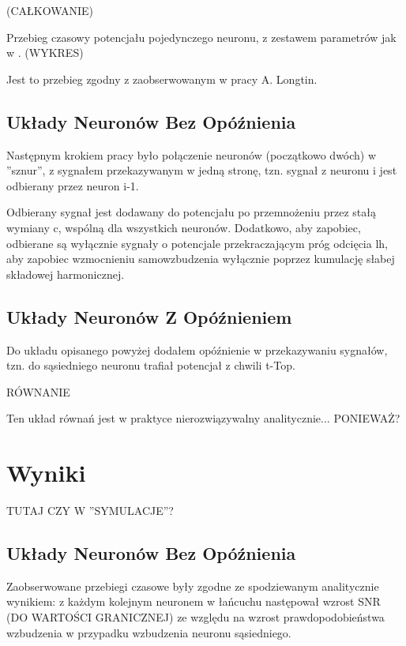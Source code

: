 \documentclass[12pt]{article}
\begin{document}
  (CAŁKOWANIE)
  
  Przebieg czasowy potencjału pojedynczego neuronu, z zestawem parametrów jak w \cite{longtin}.
  (WYKRES)
  
  Jest to przebieg zgodny z zaobserwowanym w pracy A. Longtin.
  
  \subsection{Układy Neuronów Bez Opóźnienia}
  
  Następnym krokiem pracy było połączenie neuronów (początkowo dwóch) w ''sznur'', z sygnałem przekazywanym w jedną stronę, tzn. sygnał z neuronu i jest odbierany przez neuron i-1.
  
  Odbierany sygnał jest dodawany do potencjału po przemnożeniu przez stałą wymiany c, wspólną dla wszystkich neuronów. Dodatkowo, aby zapobiec, odbierane są wyłącznie sygnały o potencjale przekraczającym próg odcięcia lh, aby zapobiec wzmocnieniu samowzbudzenia wyłącznie poprzez kumulację słabej składowej harmonicznej.
  
  \subsection{Układy Neuronów Z Opóźnieniem}
  
  Do układu opisanego powyżej dodałem opóźnienie w przekazywaniu sygnałów, tzn. do sąsiedniego neuronu trafiał potencjał z chwili t-Top.
  
  RÓWNANIE
  
  Ten układ równań jest w praktyce nierozwiązywalny analitycznie... PONIEWAŻ?
  
  \section{Wyniki}
  
  TUTAJ CZY W ''SYMULACJE''?
  
  \subsection{Układy Neuronów Bez Opóźnienia}
  
  Zaobserwowane przebiegi czasowe były zgodne ze spodziewanym analitycznie wynikiem: z każdym kolejnym neuronem w łańcuchu następował wzrost SNR (DO WARTOŚCI GRANICZNEJ) ze względu na wzrost prawdopodobieństwa wzbudzenia w przypadku wzbudzenia neuronu sąsiedniego.
  
  
  \newpage
  
  
  
  
  
\end{document}
